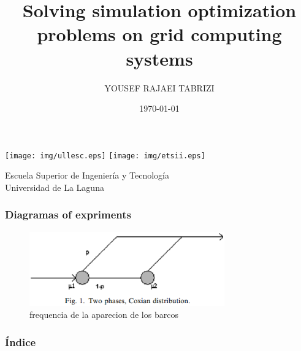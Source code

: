 \documentclass{beamer}
\title[Peresentacion de la asignatura CA ]{Solving simulation optimization problems on grid
computing systems}
\author[Autor]{YOUSEF RAJAEI TABRIZI}
\institute[ULL]{Universidad de La Laguna}
\date[11-1-2016]{\today}
\begin{document}
  
\begin{frame}

  \texttt{[image: img/ullesc.eps]}
  \hspace*{7.5cm}
  \texttt{[image: img/etsii.eps]}
  \titlepage

  \begin{scriptsize}
    \begin{center}
     Escuela Superior de Ingeniería y Tecnología \\
     Universidad de La Laguna
    \end{center}
  \end{scriptsize}

\end{frame}
\begin{frame}
\frametitle{Diagramas of expriments }
\begin{figure}[!th]
\begin{center}
\includegraphics[width=0.75\textwidth]{img/queu.eps}
\caption{frequencia de la aparecion de los barcos}
\label{fig:1}
\end{center}
\end{figure}
\end{frame}

\begin{frame}
  \frametitle{Índice}  
  \tableofcontents[pausesections]
\end{frame}
\end{document}
